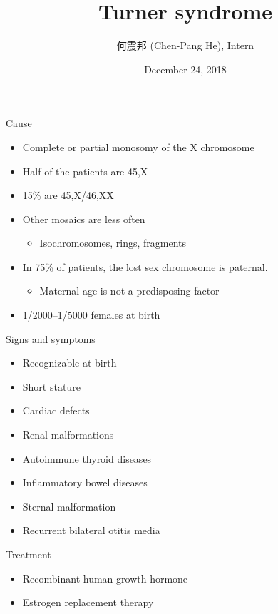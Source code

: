 \documentclass{beamer}
\title{Turner syndrome}
\author[Chen-Pang He]{何震邦 (Chen-Pang He), Intern}
\institute[CGH]{Cathay General Hospital}
\date{December 24, 2018}
\begin{document}
\maketitle

\begin{frame}{Cause}
    \begin{itemize}
        \item Complete or partial monosomy of the X chromosome
        \item Half of the patients are 45,X
        \item 15\% are 45,X/46,XX
        \item Other mosaics are less often
            \begin{itemize}
                \item Isochromosomes, rings, fragments
            \end{itemize}
        \item In 75\% of patients, the lost sex chromosome is paternal.
            \begin{itemize}
                \item Maternal age is not a predisposing factor
            \end{itemize}
        \item 1/2000--1/5000 females at birth
    \end{itemize}
\end{frame}

\begin{frame}{Signs and symptoms}
    \begin{itemize}
        \item Recognizable at birth
        \item Short stature
        \item Cardiac defects
        \item Renal malformations
        \item Autoimmune thyroid diseases
        \item Inflammatory bowel diseases
        \item Sternal malformation
        \item Recurrent bilateral otitis media
    \end{itemize}
\end{frame}

\begin{frame}{Treatment}
    \begin{itemize}
        \item Recombinant human growth hormone
        \item Estrogen replacement therapy
    \end{itemize}
\end{frame}
\end{document}
